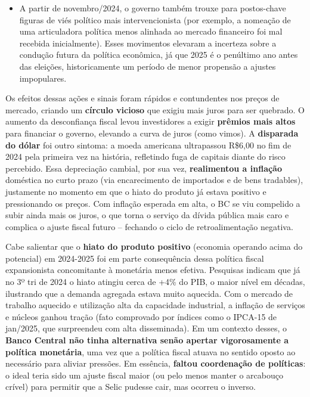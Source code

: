 \documentclass[a4paper,12pt]{article}
\begin{document}
\begin{itemize}
    \item A partir de novembro/2024, o governo também trouxe para postos-chave figuras de viés político mais intervencionista (por exemplo, a nomeação de uma articuladora política menos alinhada ao mercado financeiro foi mal recebida inicialmente). Esses movimentos elevaram a incerteza sobre a condução futura da política econômica, já que 2025 é o penúltimo ano antes das eleições, historicamente um período de menor propensão a ajustes impopulares.
\end{itemize}

Os efeitos dessas ações e sinais foram rápidos e contundentes nos preços de mercado, criando um \textbf{círculo vicioso} que exigiu mais juros para ser quebrado. O aumento da desconfiança fiscal levou investidores a exigir \textbf{prêmios mais altos} para financiar o governo, elevando a curva de juros (como vimos). A \textbf{disparada do dólar} foi outro sintoma: a moeda americana ultrapassou R\$6,00 no fim de 2024 pela primeira vez na história, refletindo fuga de capitais diante do risco percebido. Essa depreciação cambial, por sua vez, \textbf{realimentou a inflação} doméstica no curto prazo (via encarecimento de importados e de bens tradables), justamente no momento em que o hiato do produto já estava positivo e pressionando os preços. Com inflação esperada em alta, o BC se viu compelido a subir ainda mais os juros, o que torna o serviço da dívida pública mais caro e complica o ajuste fiscal futuro -- fechando o ciclo de retroalimentação negativa. 

Cabe salientar que o \textbf{hiato do produto positivo} (economia operando acima do potencial) em 2024-2025 foi em parte consequência dessa política fiscal expansionista concomitante à monetária menos efetiva. Pesquisas indicam que já no 3º tri de 2024 o hiato atingiu cerca de +4\% do PIB, o maior nível em décadas, ilustrando que a demanda agregada estava muito aquecida. Com o mercado de trabalho aquecido e utilização alta da capacidade industrial, a inflação de serviços e núcleos ganhou tração (fato comprovado por índices como o IPCA-15 de jan/2025, que surpreendeu com alta disseminada). Em um contexto desses, o \textbf{Banco Central não tinha alternativa senão apertar vigorosamente a política monetária}, uma vez que a política fiscal atuava no sentido oposto ao necessário para aliviar pressões. Em essência, \textbf{faltou coordenação de políticas}: o ideal teria sido um ajuste fiscal maior (ou pelo menos manter o arcabouço crível) para permitir que a Selic pudesse cair, mas ocorreu o inverso.
\end{document}
